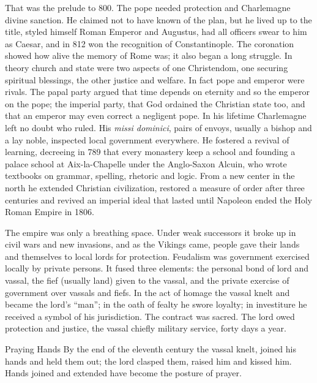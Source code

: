 That was the prelude to 800. The pope needed protection and Charlemagne divine sanction. He claimed
not to have known of the plan, but he lived up to the title, styled himself Roman Emperor and
Augustus, had all officers swear to him as Caesar, and in 812 won the recognition of Constantinople.
The coronation showed how alive the memory of Rome was; it also began a long struggle. In theory
church and state were two aspects of one Christendom, one securing spiritual blessings, the other
justice and welfare. In fact pope and emperor were rivals. The papal party argued that time depends
on eternity and so the emperor on the pope; the imperial party, that God ordained the Christian state
too, and that an emperor may even correct a negligent pope. In his lifetime Charlemagne left no doubt
who ruled. His \emph{missi dominici}, pairs of envoys, usually a bishop and a lay noble, inspected
local government everywhere. He fostered a revival of learning, decreeing in 789 that every monastery
keep a school and founding a palace school at Aix-la-Chapelle under the Anglo-Saxon Alcuin, who wrote
textbooks on grammar, spelling, rhetoric and logic. From a new center in the north he extended
Christian civilization, restored a measure of order after three centuries and revived an imperial
ideal that lasted until Napoleon ended the Holy Roman Empire in 1806.

The empire was only a breathing space. Under weak successors it broke up in civil wars and new
invasions, and as the Vikings came, people gave their lands and themselves to local lords for
protection. Feudalism was government exercised locally by private persons. It fused three elements:
the personal bond of lord and vassal, the fief (usually land) given to the vassal, and the private
exercise of government over vassals and fiefs. In the act of homage the vassal knelt and became the
lord's ``man''; in the oath of fealty he swore loyalty; in investiture he received a symbol of his
jurisdiction. The contract was sacred. The lord owed protection and justice, the vassal chiefly
military service, forty days a year.

\begin{sidebox}{Praying Hands}
By the end of the eleventh century the vassal knelt, joined his hands and held them out; the lord
clasped them, raised him and kissed him. Hands joined and extended have become the posture of prayer.
\end{sidebox}

